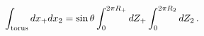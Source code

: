 \begin{equation}
\int_{\rm torus} dx_+ dx_2 =
     \sin\theta\int_0^{2\pi R_+}dZ_+\int_0^{2\pi R_2}dZ_2\,.
\end{equation}


